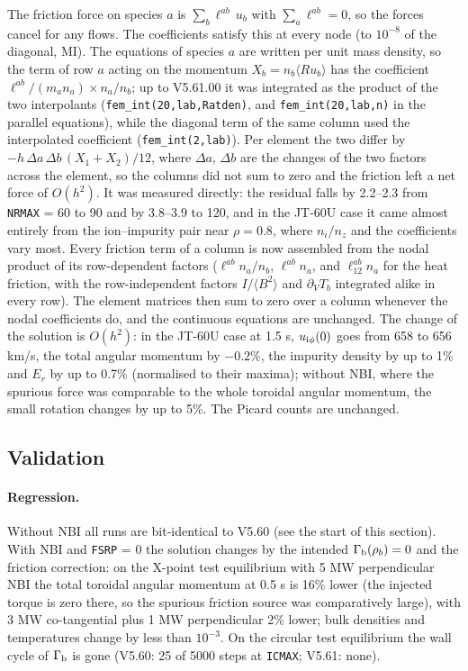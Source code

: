 \documentclass[11pt]{article}
\def\r#1{{\rm#1}}
\def\aves#1{\langle#1\rangle}
\begin{document}
The friction force on species $a$ is $\sum_b \ell^{ab}\,u_b$ with $\sum_a\ell^{ab} = 0$,
so the forces cancel for any flows.  The coefficients satisfy this at every node (to
$10^{-8}$ of the diagonal, MI).  The equations of species $a$ are written per unit
mass density, so the term of row $a$ acting on the momentum $X_b = n_b\aves{Ru_b}$ has
the coefficient $\ell^{ab}/(m_a n_a)\times n_a/n_b$; up to V5.61.00 it was integrated
as the product of the two interpolants (\texttt{fem\_int(20,lab,Ratden)}, and
\texttt{fem\_int(20,lab,n)} in the parallel equations), while the diagonal term of
the same column used the interpolated coefficient (\texttt{fem\_int(2,lab)}).  Per
element the two differ by $-h\,\Delta a\,\Delta b\,(X_1+X_2)/12$, where $\Delta a$,
$\Delta b$ are the changes of the two factors across the element, so the columns did
not sum to zero and the friction left a net force of $O(h^2)$.  It was measured
directly: the residual falls by 2.2--2.3 from \texttt{NRMAX} = 60 to 90 and by 3.8--3.9
to 120, and in the JT-60U case it came almost entirely from the ion--impurity pair
near $\rho = 0.8$, where $n_i/n_z$ and the coefficients vary most.  Every friction
term of a column is now assembled from the nodal product of its row-dependent
factors ($\ell^{ab}n_a/n_b$, $\ell^{ab}n_a$, and $\ell_{12}^{ab}n_a$ for the heat
friction, with the row-independent factors $I/\aves{B^2}$ and $\partial_V T_b$
integrated alike in every row).  The element matrices then sum to zero over a column
whenever the nodal coefficients do, and the continuous equations are unchanged.  The
change of the solution is $O(h^2)$: in the JT-60U case at 1.5 s, $u_{\r{i}\phi}(0)$
goes from 658 to 656 km/s, the total angular momentum by $-0.2$\%, the impurity density
by up to 1\% and $E_r$ by up to 0.7\% (normalised to their maxima); without NBI, where
the spurious force was comparable to the whole toroidal angular momentum, the small
rotation changes by up to 5\%.  The Picard counts are unchanged.

\subsection{Validation}
\label{sec:v561val}

\paragraph{Regression.}  Without NBI all runs are bit-identical to V5.60 (see the
start of this section).  With NBI and \texttt{FSRP} = 0 the solution changes by the
intended $\Gamma_\r{b}(\rho_b)=0$ and the friction correction: on the X-point test
equilibrium with 5 MW perpendicular NBI the total toroidal angular momentum at
0.5 s is 16\% lower (the injected torque is zero there, so the spurious friction
source was comparatively large), with 3 MW co-tangential plus 1 MW perpendicular
2\% lower; bulk densities and temperatures change by less than $10^{-3}$.  On the
circular test equilibrium the wall cycle of $\Gamma_\r{b}$ is gone (V5.60: 25 of 5000
steps at \texttt{ICMAX}; V5.61: none).
\end{document}
